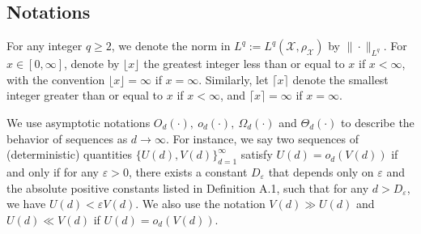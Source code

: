 \documentclass{article}
\theoremstyle{plain}
\theoremstyle{definition}
\theoremstyle{remark}
\newcommand{\dhnote}[1]{{\color{red}[#1]} } %
\begin{document}

    





















\fi


\subsection{Notations}\label{subsec_notations}
For any integer $q \geq 2$, we denote the norm in $L^q:=L^q(\mathcal{X}, \rho_{\mathcal{X}})$ by $\|\cdot\|_{L^q}$. 
For \( x \in [0, \infty] \), denote by \( \lfloor x \rfloor \) the greatest integer less than or equal to \( x \) if \( x < \infty \), with the convention  \( \lfloor x \rfloor = \infty \) if \( x = \infty \). Similarly, let \( \lceil x \rceil \) denote the smallest integer greater than or equal to \( x \) if \( x < \infty \), and \( \lceil x \rceil = \infty \) if \( x = \infty \).

We use asymptotic notations $O_d(\cdot),~o_d(\cdot),~\Omega_d(\cdot)$ and $\Theta_d(\cdot)$ to describe the behavior of sequences as $d \to \infty$.
For instance, we say two sequences of (deterministic) quantities $\{U(d), V(d)\}_{d=1}^{\infty}$ satisfy $U(d) =  o_{d}(V(d))$ if and only if for any $\varepsilon > 0$, there exists a constant $D_{\varepsilon}$ that depends only on $\varepsilon$ and the absolute positive constants listed in Definition A.1, such that for any $d > D_{\varepsilon}$, we have $U(d)< \varepsilon V(d)$. 
We also use the notation $V(d) \gg U(d)$ and $U(d)\ll V(d)$ if $U(d) = o_{d}(V(d))$.
\end{document}
